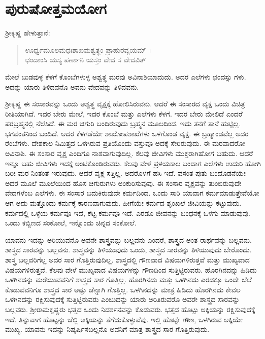 
\chapter{ಪುರುಷೋತ್ತಮಯೋಗ}

ಶ್ರೀಕೃಷ್ಣ ಹೇಳುತ್ತಾನೆ:

\begin{verse}
ಊರ್ಧ್ವಮೂಲಮಧಃಶಾಖಮಶ್ವತ್ಥಂ ಪ್ರಾಹುರವ್ಯಯಮ್ ।\\ಛಂದಾಂಸಿ ಯಸ್ಯ ಪರ್ಣಾನಿ ಯಸ್ತಂ ವೇದ ಸ ವೇದವಿತ್ 
\end{verse}

{\small ಮೇಲೆ ಬುಡವುಳ್ಳ ಕೆಳಗೆ ಕೊಂಬೆಗಳುಳ್ಳ ಅಶ್ವತ್ಥ ಮರವು ಅವಿನಾಶಿಯಾದುದು. ಅದರ ಎಲೆಗಳು ಛಂದಸ್ಸು ಗಳು. ಅದನ್ನು ಯಾರು ತಿಳಿದವನೊ ಅವನು ವೇದವನ್ನು ತಿಳಿದವನು.}

ಶ್ರೀಕೃಷ್ಣ ಈ ಸಂಸಾರವನ್ನು ಒಂದು ಅಶ್ವತ್ಥ ವೃಕ್ಷಕ್ಕೆ ಹೋಲಿಸಿರುವನು. ಆದರೆ ಈ ಸಂಸಾರದ ವೃಕ್ಷ ಒಂದು ವಿಚಿತ್ರ ರೀತಿಯಾಗಿದೆ. ಇದರ ಬೇರು ಮೇಲೆ, ಇದರ ಕೊಂಬೆ ಮತ್ತು ಎಲೆಗಳು ಕೆಳಗೆ. ಇದರ ಬೇರು ಮೇಲಿದೆ ಎಂದರೆ ಪರಬ್ರಹ್ಮನಲ್ಲಿ ನೆಲೆಸಿದೆ. ಈ ಮರ ಚಿಗುರಿ ಬಂದಿರುವುದು ಬ್ರಹ್ಮನ ಮೂಲದಿಂದ. ಇದು ತನಗೆ ತಾನೆ ಹುಟ್ಟಿಲ್ಲ. ಭಗವಂತನಿಂದ ಬಂದಿದೆ. ಅದರ ಕೆಳಗಡೆಯೇ ಶಾಖೋಪಶಾಖೆಗಳು ಒಳಗೊಂಡ ವೃಕ್ಷ. ಈ ಬ್ರಹ್ಮಾಂಡವೆಲ್ಲ ಅದರ ರೆಂಬೆಗಳು. ದೇಶಕಾಲ ನಿಮಿತ್ತದ ಒಳಗಿರುವ ಪ್ರತಿಯೊಂದು ವಸ್ತುವೂ ಅದಕ್ಕೆ ಸೇರಿರುವುದು. ಈ ಮರವಾದರೋ ಅವಿನಾಶಿ. ಈ ಸಂಸಾರ ವೃಕ್ಷ ಎಂದಿಗೂ ನಾಶವಾಗುವುದಿಲ್ಲ. ಕೆಲವು ಜೀವಿಗಳು ಮುಕ್ತರಾಗಿಹೋಗ ಬಹುದು. ಆದರೆ ಇನ್ನೂ ಬಹು ಜೀವಿಗಳು ಇದಕ್ಕೆ ಅಂಟಿಕೊಂಡಿರುವರು. ಕೆಲವು ವೇಳೆ ಪ್ರಳಯಕಾಲ ಬಂದಾಗ ಎಲೆಗಳು ಉದುರಿ ಹೋಗಿ ಬರೀ ಮರ ನಿಂತಂತೆ ಇರುವುದು. ಆದರೆ ವೃಕ್ಷ ಸತ್ತಿಲ್ಲ. ಅದರೊಳಗೆ ಹಸಿ ಇದೆ. ವಸಂತ ಪುತು ಬಂದೊಡನೆಯೇ ಅದರ ಮೂಲೆ ಮೂಲೆಯಿಂದ ಹೊಸ ಚಿಗುರುಗಳು ಅಂಕುರಿಸುವುವು. ಈ ಸಂಸಾರ ವೃಕ್ಷವನ್ನು ತುಂಬಿರುವುದೇ ವೇದಗಳೆಂಬ ಎಲೆಗಳು. ಈ ಸಂಸಾರ ಬದುಕಿರುವುದೇ ಕರ್ಮದಿಂದ. ಒಂದು ಸಾರಿ ಯಾವಾಗ ಕರ್ಮಮಾಡುತ್ತೇವೆಯೋ ಆಗ ಅದು ಮತ್ತೊಂದು ಕರ್ಮಕ್ಕೆ ಕಾರಣವಾಗುವುದು. ಹೀಗೆಯೇ ಕರ್ಮದ ಶೃಂಖಲೆ ಜೀವಿಯನ್ನು ಕಟ್ಟುವುದು. ಕರ್ಮದಲ್ಲಿ ಒಳ್ಳೆಯ ಕರ್ಮವೂ ಇದೆ, ಕೆಟ್ಟ ಕರ್ಮವೂ ಇದೆ. ಎರಡೂ ಜೀವನನ್ನು ಬಂಧನಕ್ಕೆ ಒಳಗು ಮಾಡುವುವು. ಒಂದು ಕಬ್ಬಿಣದ ಸಂಕೋಲೆ, ಇನ್ನೊಂದು ಚಿನ್ನದ ಸಂಕೋಲೆ.

ಯಾವನು ಇದನ್ನು ಅರಿಯುವನೊ ಅವನೇ ಶಾಸ್ತ್ರವನ್ನು ಬಲ್ಲವನು ಎಂದರೆ, ಶಾಸ್ತ್ರದ ಅಂತ ರಾರ್ಥವನ್ನು ಬಲ್ಲವನು. ಶಾಸ್ತ್ರದ ಸಾರವನ್ನು ಬಲ್ಲವನು. ಶಾಸ್ತ್ರವನ್ನು ತಿಳಿಯುವುದು ಒಂದು, ಶಾಸ್ತ್ರದ ಸಾರವನ್ನು ತಿಳಿಯುವುದು ಬೇರೊಂದು. ಶಾಸ್ತ್ರ ಬಲ್ಲವರಿಗೆಲ್ಲ ಅದರ ಸಾರ ಗೊತ್ತಿರುವುದಿಲ್ಲ. ಶಾಸ್ತ್ರದಲ್ಲಿ ಗೌಣವಾದ ವಿಷಯಗಳಿರುತ್ತವೆ ಮತ್ತು ಮುಖ್ಯವಾದ ವಿಷಯಗಳಿರುತ್ತವೆ. ಕೆಲವು ವೇಳೆ ಮುಖ್ಯವಾದ ವಿಷಯಗಳನ್ನು ಗೌಣದಿಂದ ಸುತ್ತಿಟ್ಟಿರುವರು. ಹೊರಗಿನದನ್ನು ಹಿಡಿದು ಒಳಗಿನದನ್ನು ಮರೆಯುವವನಿಗೆ ಶಾಸ್ತ್ರದ ಸಾರ ಗೊತ್ತಿಲ್ಲ. ಹೊರಗಿನದು ಮತ್ತು ಒಳಗಿನದು ಎರಡಕ್ಕೂ ಒಂದೇ ಬೆಲೆ ಕೊಡುವವನಿಗೂ ಶಾಸ್ತ್ರದ ಸಾರ ಅಷ್ಟು ಚೆನ್ನಾಗಿ ಗೊತ್ತಿಲ್ಲ. ಒಳಗಿನದನ್ನು ಮಾತ್ರ ಹಿಡಿದು ಹೊರಗಿನದು ಕೇವಲ ಒಳಗಿನದನ್ನು ರಕ್ಷಿಸುವುದಕ್ಕೆ ಸುತ್ತಿಟ್ಟಿರುವರು ಎಂಬುದನ್ನು ಯಾರು ಅರಿತಿರುವರೊ ಅವರೇ ಶಾಸ್ತ್ರದ ಸಾರವನ್ನು ಬಲ್ಲವರು. ಶ್ರೀರಾಮಕೃಷ್ಣರು ಭತ್ತದ ಒಂದು ನಿದರ್ಶನವನ್ನು ಕೊಡುವರು. ಭತ್ತದ ಹೊಟ್ಟು ಅಕ್ಕಿಯನ್ನು ರಕ್ಷಿಸುವುದಕ್ಕೆ ಇದೆ. ತಿನ್ನುವಾಗ ಹೊಟ್ಟನ್ನು ಚೆಲ್ಲಿ ಅಕ್ಕಿಯನ್ನು ತೆಗೆದುಕೊಳ್ಳುವೆವು. ಇಲ್ಲಿ ಹೊಟ್ಟೇ ಗೌಣ, ಒಳಗಿರುವ ಅಕ್ಕಿಯೇ ಮುಖ್ಯ. ಯಾವನು ಇದನ್ನು ನಿಷ್ಕರ್ಷಿಸಬಲ್ಲನೊ ಅವನಿಗೆ ಮಾತ್ರ ಶಾಸ್ತ್ರದ ಸಾರ ಗೊತ್ತಿರುವುದು.

